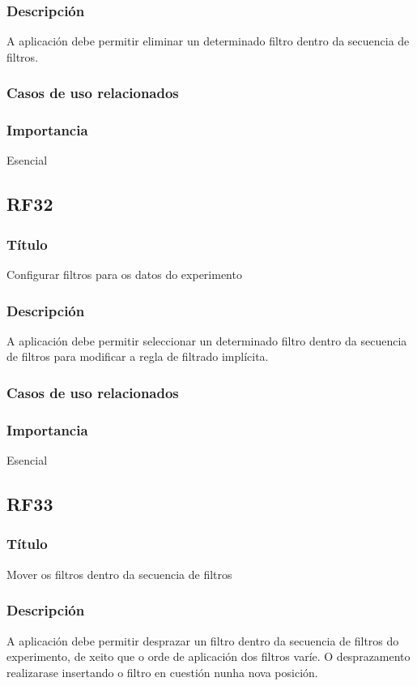 \subsubsection{Descripción}
A aplicación debe permitir eliminar un determinado filtro dentro da secuencia de filtros.
\subsubsection{Casos de uso relacionados}
\subsubsection{Importancia}
Esencial

\subsection*{RF32}
\subsubsection{Título}
Configurar filtros para os datos do experimento
\subsubsection{Descripción}
A aplicación debe permitir seleccionar un determinado filtro dentro da secuencia de filtros para modificar a regla de filtrado implícita.
\subsubsection{Casos de uso relacionados}
\subsubsection{Importancia}
Esencial

\subsection*{RF33}
\subsubsection{Título}
Mover os filtros dentro da secuencia de filtros
\subsubsection{Descripción}
A aplicación debe permitir desprazar un filtro dentro da secuencia de filtros do experimento, de xeito que o orde de aplicación dos filtros varíe. O desprazamento realizarase insertando o filtro en cuestión nunha nova posición.
